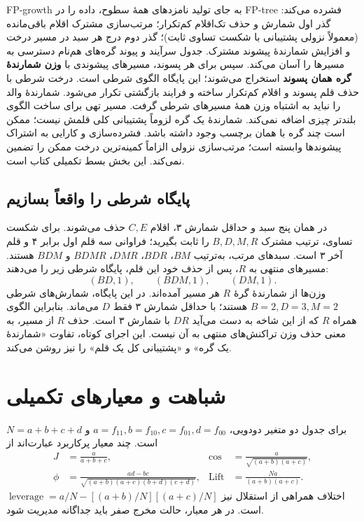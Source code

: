 FP-growth به جای تولید نامزدهای همهٔ سطوح، داده را در FP-tree فشرده می‌کند: گذر اول شمارش و حذف تک‌اقلام کم‌تکرار؛ مرتب‌سازی مشترک اقلام باقی‌مانده (معمولاً نزولی پشتیبانی با شکست تساوی ثابت)؛ گذر دوم درج هر سبد در مسیر درخت و افزایش شمارندهٔ پیشوند مشترک. جدول سرآیند و پیوند گره‌های هم‌نام دسترسی به مسیرها را آسان می‌کند. سپس برای هر پسوند، مسیرهای پیشوندی با \textbf{وزن شمارندهٔ گره همان پسوند} استخراج می‌شوند؛ این پایگاه الگوی شرطی است. درخت شرطی با حذف قلم پسوند و اقلام کم‌تکرار ساخته و فرایند بازگشتی تکرار می‌شود. شمارندهٔ والد را نباید به اشتباه وزن همهٔ مسیرهای شرطی گرفت. مسیر تهی برای ساخت الگوی بلندتر چیزی اضافه نمی‌کند. شمارندهٔ یک گره لزوماً پشتیبانی کلی قلمش نیست؛ ممکن است چند گره با همان برچسب وجود داشته باشد. فشرده‌سازی و کارایی به اشتراک پیشوندها وابسته است؛ مرتب‌سازی نزولی الزاماً کمینه‌ترین درخت ممکن را تضمین نمی‌کند. این بخش بسط تکمیلی کتاب است.


\subsection*{پایگاه شرطی را واقعاً بسازیم}
در همان پنج سبد و حداقل شمارش ۳، اقلام $C,E$ حذف می‌شوند. برای شکست تساوی، ترتیب مشترک $B,D,M,R$ را ثابت بگیرید؛ فراوانی سه قلم اول برابر ۴ و قلم آخر ۳ است. سبدهای مرتب، به‌ترتیب $BM$، $BDR$، $DMR$، $BDMR$ و $BDM$ هستند. مسیرهای منتهی به $R$، پس از حذف خود این قلم، پایگاه شرطی زیر را می‌دهند:
\[ (BD,1),\qquad(BDM,1),\qquad(DM,1).\]
وزن‌ها از شمارندهٔ گرهٔ $R$ هر مسیر آمده‌اند. در این پایگاه، شمارش‌های شرطی $B=2,D=3,M=2$ هستند؛ با حداقل شمارش ۳ فقط $D$ می‌ماند. بنابراین الگوی همراه $R$ که از این شاخه به دست می‌آید $DR$ با شمارش ۳ است. حذف $R$ از مسیر، به معنی حذف وزن تراکنش‌های منتهی به آن نیست. این اجرای کوتاه، تفاوت «شمارندهٔ یک گره» و «پشتیبانی کل یک قلم» را نیز روشن می‌کند.

\section{شباهت و معیارهای تکمیلی}

برای جدول دو متغیر دودویی، $a=f_{11},b=f_{10},c=f_{01},d=f_{00}$ و $N=a+b+c+d$ است. چند معیار پرکاربرد عبارت‌اند از
\begin{align*}
J&=\frac a{a+b+c},&\operatorname{cos}&=\frac a{\sqrt{(a+b)(a+c)}},\\
\phi&=\frac{ad-bc}{\sqrt{(a+b)(a+c)(b+d)(c+d)}},&\operatorname{Lift}&=\frac{Na}{(a+b)(a+c)}.
\end{align*}
اختلاف همراهی از استقلال نیز $\operatorname{leverage}=a/N-[(a+b)/N][(a+c)/N]$ است. در هر معیار، حالت مخرج صفر باید جداگانه مدیریت شود.

